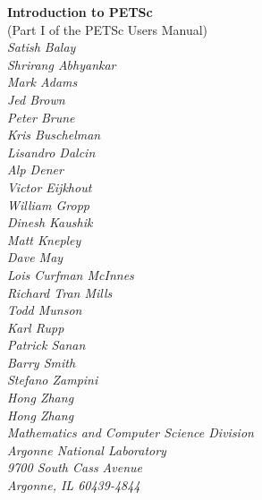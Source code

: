 %
%
%
%


\def\design{\medskip \noindent Design Issue:\begin{em}}
\def\enddesign{\end{em} \medskip}


\def\shortintro{*}
\renewcommand{\cite}[1]{}
\def\thesection {$\!\!\!\!$}

\usepackage{fancyhdr,lastpage}
\pagestyle{fancy}



\begin{center}
$\!$
\vspace{1.0cm}
\thispagestyle{empty}

{\huge \bf Introduction to PETSc}\\
\vspace{0.5cm}
{\LARGE (Part I of the PETSc Users Manual)} \\
\vspace{1.5cm}
{\large \em Satish Balay\\Shrirang Abhyankar\\Mark Adams\\Jed Brown\\Peter Brune\\Kris Buschelman\\Lisandro Dalcin\\Alp Dener\\Victor Eijkhout\\William Gropp\\Dinesh Kaushik\\Matt Knepley\\Dave May\\Lois Curfman McInnes\\Richard Tran Mills\\Todd Munson\\Karl Rupp\\Patrick Sanan\\Barry Smith\\Stefano Zampini\\Hong Zhang\\Hong Zhang\\
\medskip \medskip
Mathematics and Computer Science Division\\
Argonne National Laboratory\\
9700 South Cass Avenue\\
Argonne, IL 60439-4844\\
}
\end{center}

